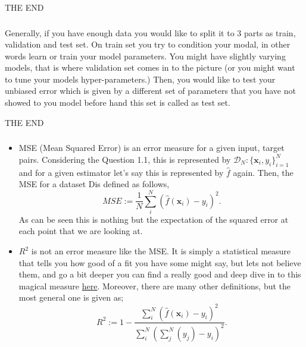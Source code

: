 \documentclass{article}
\begin{document}
\begin{center}
   THE END
\end{center}

\subsubsection{}
Generally, if you have enough data you would like to split it to 3 parts as train, validation and test set. On train set you try to condition your modal, in other words learn or train your model parameters. You might have slightly varying models, that is where validation set comes in to the picture (or you might want to tune your models hyper-parameters.) Then, you would like to test your unbiased error which is given by a different set of parameters that you have not showed to you model before hand this set is called as test set.

\begin{center}
   THE END
\end{center}

\subsubsection{}
\begin{itemize}
  \item MSE (Mean Squared Error) is an error measure for a given input, target pairs. Considering the Question 1.1, this is represented by $\mathcal{D}_N:\{\mathbf{x}_i, y_i\}_{i=1}^{N}$ and for a given estimator let's say this is represented by $\hat{f}$ again. Then, the MSE for a dataset Dis defined as follows,
\begin{equation}
  MSE:= \frac{1}{N}\sum_i^N(\hat{f}(\mathbf{x}_i)-y_i)^2.
\end{equation}
As can be seen this is nothing but the expectation of the squared error at each point that we are looking at. 
  \item $R^2$ is not an error measure like the MSE. It is simply a statistical measure that tells you how good of a fit you have some might say, but lets not believe them, and go a bit deeper you can find a really good and deep dive in to this magical measure \href{https://www.stat.cmu.edu/~cshalizi/mreg/15/lectures/10/lecture-10.pdf}{here}. Moreover, there are many other definitions, but the most general one is given as;
    \begin{equation}
      R^2:= 1- \frac{\sum_i^N(\hat{f}(\mathbf{x}_i)-y_i)^2}{\sum_i^N(\sum_j^N(y_j)-y_i)^2}.
    \end{equation}
\end{itemize}
\end{document}
